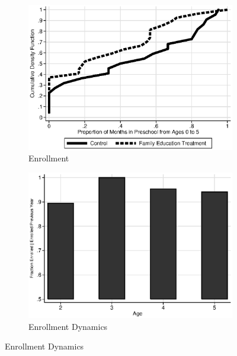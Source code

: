 \begin{figure}
\centering
\caption{Control Substitution Characteristics, ABC/CARE Control Group}\label{fig:control-sub}
\begin{subfigure}[h]{0.4\textwidth}
		\centering
		\caption{Enrollment} \label{fig:treatsubcare}
		\includegraphics[width=\textwidth]{output/care_controlcontamination_months.eps}
\end{subfigure}%
\begin{subfigure}[h]{0.4\textwidth}
		\centering
		\caption{Enrollment Dynamics} \label{fig:treatsubcare}
		\includegraphics[width=\textwidth]{output/abccare_Vprobs.eps}
\end{subfigure}


\end{figure}
